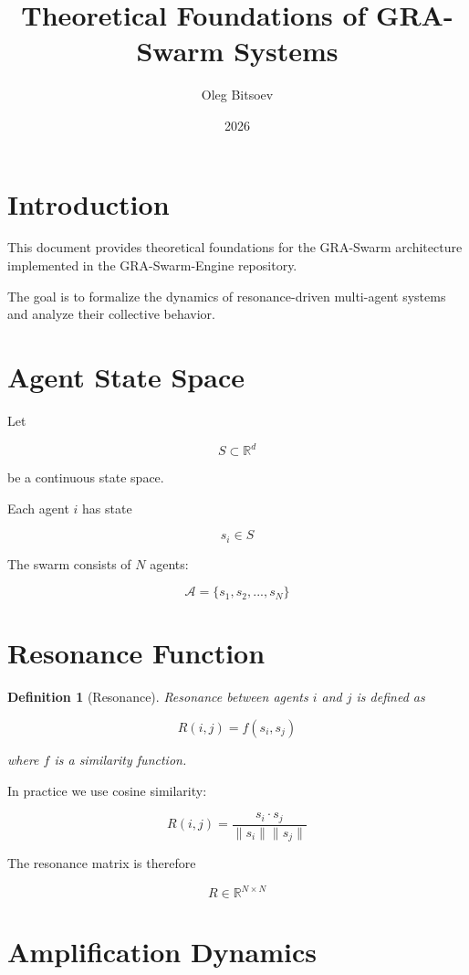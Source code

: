 \documentclass[11pt]{article}
\title{Theoretical Foundations of GRA-Swarm Systems}
\author{Oleg Bitsoev}
\date{2026}
\newtheorem{definition}{Definition}
\begin{document}
\maketitle

\section{Introduction}

This document provides theoretical foundations for the GRA-Swarm architecture implemented in the GRA-Swarm-Engine repository.

The goal is to formalize the dynamics of resonance-driven multi-agent systems and analyze their collective behavior.

\section{Agent State Space}

Let

\[
S \subset \mathbb{R}^d
\]

be a continuous state space.

Each agent \(i\) has state

\[
s_i \in S
\]

The swarm consists of \(N\) agents:

\[
\mathcal{A} = \{s_1, s_2, ..., s_N\}
\]

\section{Resonance Function}

\begin{definition}[Resonance]

Resonance between agents \(i\) and \(j\) is defined as

\[
R(i,j) = f(s_i, s_j)
\]

where \(f\) is a similarity function.

\end{definition}

In practice we use cosine similarity:

\[
R(i,j) =
\frac{s_i \cdot s_j}{\|s_i\|\|s_j\|}
\]

The resonance matrix is therefore

\[
R \in \mathbb{R}^{N \times N}
\]

\section{Amplification Dynamics}
\end{document}
